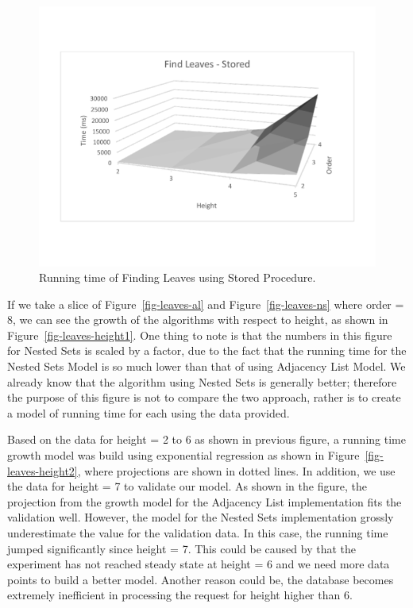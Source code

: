 \begin{figure}
\begin{center}
\includegraphics[width=6in]{images/eval/leaves/sr_surface.pdf}
\caption{Running time of Finding Leaves using Stored Procedure.\label{fig-leaves-sr}}
\end{center}
\end{figure}

If we take a slice of Figure~\ref{fig-leaves-al} and Figure~\ref{fig-leaves-ns} where order = 8, we can see the growth of the algorithms with respect to height, as shown in Figure~\ref{fig-leaves-height1}. One thing to note is that the numbers in this figure for Nested Sets is scaled by a factor, due to the fact that the running time for the Nested Sets Model is so much lower than that of using Adjacency List Model. We already know that the algorithm using Nested Sets is generally better; therefore the purpose of this figure is not to compare the two approach, rather is to create a model of running time for each using the data provided.


Based on the data for height = 2 to 6 as shown in previous figure, a running time growth model was build using exponential regression as shown in Figure~\ref{fig-leaves-height2}, where projections are shown in dotted lines. In addition, we use the data for height = 7 to validate our model. As shown in the figure, the projection from the growth model for the Adjacency List implementation fits the validation well. However, the model for the Nested Sets implementation grossly underestimate the value for the validation data. In this case, the running time jumped significantly since height = 7. This could be caused by that the experiment has not reached steady state at height = 6 and we need more data points to build a better model. Another reason could be, the database becomes extremely inefficient in processing the request for height higher than 6.

